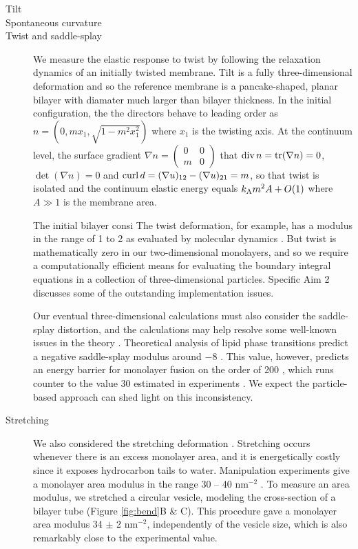 \begin{description}
\item[Tilt]
\item[Spontaneous curvature]
\item[Twist and saddle-splay]
  We measure the elastic response to twist by following the relaxation
  dynamics of an initially twisted membrane. Tilt is a fully three-dimensional deformation
  and so the reference membrane is a pancake-shaped, planar bilayer with diamater
  much larger than bilayer thickness.  In the initial configuration, the 
  the directors behave to leading order as $n = (0, mx_1, \sqrt{1 - m^2x_1^2})$
  where $x_1$ is the twisting axis. At the continuum level, 
  the surface gradient $\nabla n = \begin{pmatrix}0 & 0\\ m & 0\end{pmatrix}$ that $\operatorname{div} n = \mathrm{tr}(\nabla n) = 0$,
  $\det(\nabla n) = 0$ and $\operatorname{curl} d = (\nabla u)_{12} - (\nabla u)_{21} = m$,
  so that twist is isolated and the continuum elastic energy equals $k_{\mathrm{A}} m^2 A + O(1)$ where
  $A \gg 1$ is the membrane area. 
  
  
  The initial bilayer consi
The twist deformation, for example, has a modulus in the range of 1 to 2 \kBT\; 
as evaluated by molecular dynamics \cite{LeVeWa14}. 
But twist is mathematically zero in our two-dimensional monolayers,
and so we require a computationally efficient means for evaluating the 
boundary integral equations in a collection of three-dimensional particles. 
Specific Aim 2 discusses some of the outstanding implementation issues. 

Our eventual three-dimensional calculations must also consider the saddle-splay distortion,
and the calculations may help resolve some well-known issues in the theory \cite{TerziDeserno17}. 
Theoretical analysis of lipid phase transitions predict a negative saddle-splay modulus around $-8$ \kBT\;
\cite{SIEGEL2004366,SIEGEL20085200}.
This value, however, 
predicts an energy barrier for monolayer fusion on the order of 200  \kBT, which runs counter to 
the value 30 \kBT\; estimated in experiments \cite{RyKlYaCo16,FrRoPi17,Tran7106}.  
We expect the particle-based approach can shed light on this inconsistency.   
\item[Stretching]
We also considered the stretching deformation \cite{Fu19}. 
Stretching occurs whenever there is an excess monolayer area,
and it is energetically costly since it exposes hydrocarbon tails to water. 
Manipulation experiments give a monolayer area modulus in the range 
30 -- 40 \kBT\; nm$^{-2}$ \cite{Nagle17, Nagle17-2}. 
To measure an area modulus, we stretched a circular vesicle, modeling the cross-section 
of a bilayer tube (Figure \ref{fig:bend}B \& C).
This procedure gave a monolayer area modulus 
34 $\pm$ 2 \kBT \;nm$^{-2}$, independently of the vesicle size, which
is also remarkably close to the experimental value.    



\end{description}

